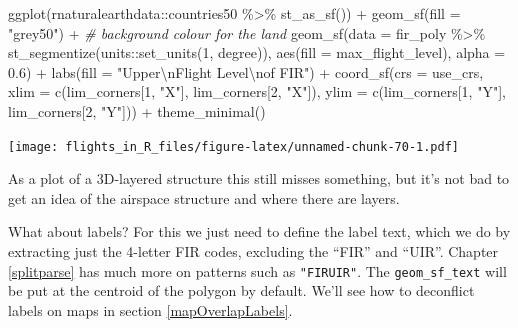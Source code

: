 \documentclass[
]{book}
\newenvironment{Shaded}{\begin{snugshade}}{\end{snugshade}}
\newcommand{\AttributeTok}[1]{\textcolor[rgb]{0.77,0.63,0.00}{#1}}
\newcommand{\CommentTok}[1]{\textcolor[rgb]{0.56,0.35,0.01}{\textit{#1}}}
\newcommand{\DecValTok}[1]{\textcolor[rgb]{0.00,0.00,0.81}{#1}}
\newcommand{\FloatTok}[1]{\textcolor[rgb]{0.00,0.00,0.81}{#1}}
\newcommand{\FunctionTok}[1]{\textcolor[rgb]{0.00,0.00,0.00}{#1}}
\newcommand{\NormalTok}[1]{#1}
\newcommand{\SpecialCharTok}[1]{\textcolor[rgb]{0.00,0.00,0.00}{#1}}
\newcommand{\StringTok}[1]{\textcolor[rgb]{0.31,0.60,0.02}{#1}}
\begin{document}
\begin{Shaded}
\begin{Highlighting}[]
\FunctionTok{ggplot}\NormalTok{(rnaturalearthdata}\SpecialCharTok{::}\NormalTok{countries50 }\SpecialCharTok{\%\textgreater{}\%} 
         \FunctionTok{st\_as\_sf}\NormalTok{()) }\SpecialCharTok{+}
  \FunctionTok{geom\_sf}\NormalTok{(}\AttributeTok{fill =} \StringTok{"grey50"}\NormalTok{) }\SpecialCharTok{+} \CommentTok{\# background colour for the land}
  \FunctionTok{geom\_sf}\NormalTok{(}\AttributeTok{data =}\NormalTok{ fir\_poly }\SpecialCharTok{\%\textgreater{}\%} 
            \FunctionTok{st\_segmentize}\NormalTok{(units}\SpecialCharTok{::}\FunctionTok{set\_units}\NormalTok{(}\DecValTok{1}\NormalTok{, degree)), }
          \FunctionTok{aes}\NormalTok{(}\AttributeTok{fill =}\NormalTok{ max\_flight\_level), }\AttributeTok{alpha =} \FloatTok{0.6}\NormalTok{) }\SpecialCharTok{+}
  \FunctionTok{labs}\NormalTok{(}\AttributeTok{fill =} \StringTok{"Upper}\SpecialCharTok{\textbackslash{}n}\StringTok{Flight Level}\SpecialCharTok{\textbackslash{}n}\StringTok{of FIR"}\NormalTok{) }\SpecialCharTok{+}
  \FunctionTok{coord\_sf}\NormalTok{(}\AttributeTok{crs =}\NormalTok{ use\_crs, }
           \AttributeTok{xlim =} \FunctionTok{c}\NormalTok{(lim\_corners[}\DecValTok{1}\NormalTok{, }\StringTok{"X"}\NormalTok{], lim\_corners[}\DecValTok{2}\NormalTok{, }\StringTok{"X"}\NormalTok{]), }
           \AttributeTok{ylim =} \FunctionTok{c}\NormalTok{(lim\_corners[}\DecValTok{1}\NormalTok{, }\StringTok{"Y"}\NormalTok{], lim\_corners[}\DecValTok{2}\NormalTok{, }\StringTok{"Y"}\NormalTok{])) }\SpecialCharTok{+}
  \FunctionTok{theme\_minimal}\NormalTok{()}
\end{Highlighting}
\end{Shaded}

\texttt{[image: flights\_in\_R\_files/figure-latex/unnamed-chunk-70-1.pdf]}

As a plot of a 3D-layered structure this still misses something, but it's not bad to get an idea of the airspace structure and where there are layers.

What about labels? For this we just need to define the label text, which we do by extracting just the 4-letter FIR codes, excluding the ``FIR'' and ``UIR''. Chapter \ref{splitparse} has much more on patterns such as \texttt{"FIR\textbar{}UIR"}. The \texttt{geom\_sf\_text} will be put at the centroid of the polygon by default. We'll see how to deconflict labels on maps in section \ref{mapOverlapLabels}.
\end{document}
